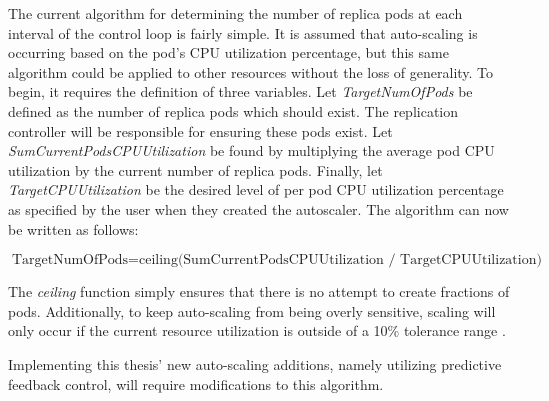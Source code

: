 The current algorithm for determining the number of replica pods at each interval
of the control loop is fairly simple. It is assumed that auto-scaling is
occurring based on the pod's CPU utilization percentage, but this same algorithm
could be applied to other resources without the loss of generality.
To begin, it requires the definition of
three variables. Let \textit{TargetNumOfPods} be defined as the number of
replica pods which should exist. The replication controller will be responsible
for ensuring these pods exist. Let \textit{SumCurrentPodsCPUUtilization} be
found by multiplying the average pod CPU utilization by the current number of
replica pods. Finally, let \textit{TargetCPUUtilization} be the desired level of
per pod CPU utilization percentage as specified by the user when they created
the autoscaler. The algorithm can now be written as follows:

\[ \mbox{TargetNumOfPods} = \mbox{ceiling(SumCurrentPodsCPUUtilization /
TargetCPUUtilization)} \]

The \textit{ceiling} function simply ensures that there is no attempt to create
fractions of pods. Additionally, to keep auto-scaling from being overly
sensitive, scaling will only occur if the current resource utilization is
outside of a 10\% tolerance range \cite{k8s-horizontal-pod-autoscaler-proposal}.

Implementing this thesis' new auto-scaling additions, namely utilizing
predictive feedback control, will require modifications to this algorithm.
